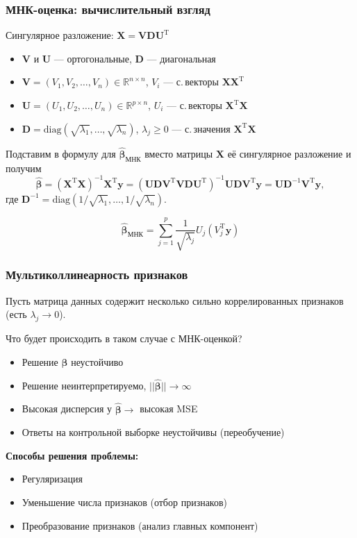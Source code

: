 \documentclass[ucs, notheorems, handout]{beamer}
\newcommand{\betah}{\hat{\bm \beta}}
\newcommand{\XT}{{\bm{X}}^{\mathrm{T}}}
\newcommand{\X}{\bm{X}}
\begin{document}
\begin{frame}
	\frametitle{МНК-оценка: вычислительный взгляд}
	
		Сингулярное разложение: $\X = \bm V \bm D \bm U^\mathrm T$
		\begin{itemize}
			\item $\bm V$ и $\bm U$ --- ортогональные, $\bm D$ --- диагональная
			\item $\bm V = (V_1, V_2, \ldots, V_n) \in \mathbb R^{n\times n}$, $V_i$ --- с.\,векторы $\X \XT$
			\item $\bm U = (U_1, U_2, \ldots, U_n) \in \mathbb R^{p\times n}$, $U_i$ --- с.\,векторы $\XT \X$
			\item $\bm D = \mathrm{diag}(\sqrt{\lambda_1}, \ldots,\sqrt{\lambda_n})$, $\lambda_j \geqslant 0$ --- с.\,значения $\XT \X$
		\end{itemize}
		
		Подставим в формулу для $\betah_{\text{МНК}}$ вместо матрицы $\X$ её сингулярное разложение и получим
		$$
\betah = (\XT \X)^{-1}\XT \bm y = (\bm U \bm D \bm V^\mathrm{T} \bm V \bm D \bm U^\mathrm{T})^{-1} \bm U \bm D \bm V^\mathrm{T} \bm y = \bm U \bm D^{-1} \bm V^\mathrm{T} \bm y,
$$
		где $\bm D^{-1} = \mathrm{diag} (1/\sqrt{\lambda_1}, \ldots, 1/\sqrt{\lambda_n})$.
		 
		\begin{equation*}
			\betah_{\text{МНК}}
			=
			\sum_{j=1}^{p}
			\frac{1}{\sqrt{\lambda_{j}}}
			U_{j}(V_{j}^{\mathrm{T}} \bm y)
		\end{equation*}
		

	\note{	
	}

\end{frame}
	

\begin{frame}
	\frametitle{Мультиколлинеарность признаков}
	
	Пусть матрица данных содержит несколько сильно коррелированных признаков (есть $\lambda_{j}\rightarrow0$).
	
	Что будет происходить в таком случае с МНК-оценкой?
	\begin{itemize}
		\item Решение $\hat{\bm \beta}$  неустойчиво 
		\item Решение неинтерпретируемо,  $||\hat{\bm \beta}||\rightarrow\infty$
		\item Высокая дисперсия у $\hat{\bm \beta} \to$ высокая MSE
		\item Ответы на контрольной выборке неустойчивы (переобучение)
	\end{itemize}
	\textbf{Способы решения проблемы:}
	\begin{itemize}
		\item Регуляризация
		\item Уменьшение числа признаков (отбор признаков)
		\item Преобразование признаков (анализ главных компонент)
	\end{itemize}
\end{frame}
\end{document}
